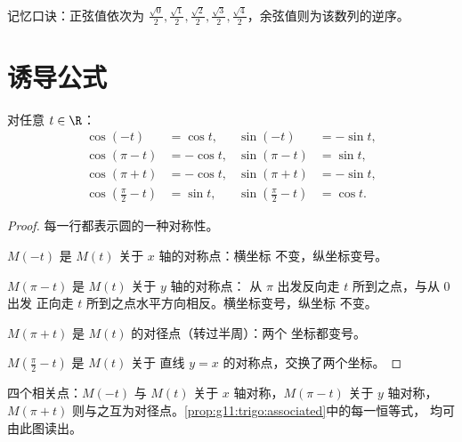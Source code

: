 \begin{remark}
记忆口诀：正弦值依次为
$\frac{\sqrt0}{2}, \frac{\sqrt1}{2}, \frac{\sqrt2}{2}, \frac{\sqrt3}{2},
\frac{\sqrt4}{2}$，余弦值则为该数列的逆序。
\end{remark}

\section{诱导公式}

\begin{proposition}[诱导公式]\label{prop:g11:trigo:associated}
对任意 $t \in \R$：
\[
\begin{aligned}
\cos(-t) &= \cos t, & \sin(-t) &= -\sin t,\\
\cos(\pi - t) &= -\cos t, & \sin(\pi - t) &= \sin t,\\
\cos(\pi + t) &= -\cos t, & \sin(\pi + t) &= -\sin t,\\
\cos\left(\tfrac{\pi}{2} - t\right) &= \sin t, &
\sin\left(\tfrac{\pi}{2} - t\right) &= \cos t .
\end{aligned}
\]
\end{proposition}

\begin{proof}
每一行都表示圆的一种对称性。

$M(-t)$ 是 $M(t)$ 关于 $x$ 轴的对称点：横坐标
不变，纵坐标变号。

$M(\pi - t)$ 是 $M(t)$ 关于 $y$ 轴的对称点：
从 $\pi$ 出发反向走 $t$ 所到之点，与从 $0$ 出发
正向走 $t$ 所到之点水平方向相反。横坐标变号，纵坐标
不变。

$M(\pi + t)$ 是 $M(t)$ 的对径点（转过半周）：两个
坐标都变号。

$M\!\left(\frac\pi2 - t\right)$ 是 $M(t)$ 关于
直线 $y = x$ 的对称点，交换了两个坐标。
\end{proof}

\begin{omfigure}

{\small 四个相关点：$M(-t)$ 与 $M(t)$ 关于
$x$ 轴对称，$M(\pi - t)$ 关于 $y$ 轴对称，$M(\pi + t)$
则与之互为对径点。\cref{prop:g11:trigo:associated}中的每一恒等式，
均可由此图读出。}
\end{omfigure}

